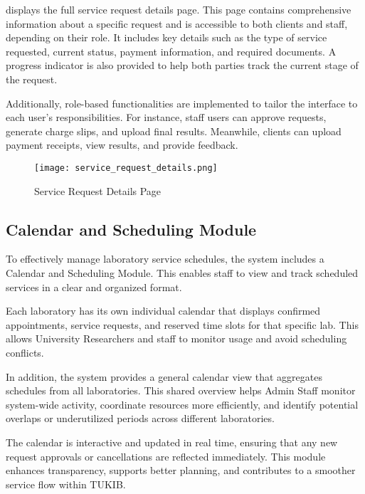  displays the full service request details page. This page contains comprehensive information about a specific request and is accessible to both clients and staff, depending on their role. It includes key details such as the type of service requested, current status, payment information, and required documents. A progress indicator is also provided to help both parties track the current stage of the request.

Additionally, role-based functionalities are implemented to tailor the interface to each user's responsibilities. For instance, staff users can approve requests, generate charge slips, and upload final results. Meanwhile, clients can upload payment receipts, view results, and provide feedback.

\newpage

\begin{figure}[h]
	\centering 
	\texttt{[image: service\_request\_details.png]}
	\caption{Service Request Details Page}
	\label{fig:service_request_details}
\end{figure}

\newpage

\subsection{Calendar and Scheduling Module}

To effectively manage laboratory service schedules, the system includes a Calendar and Scheduling Module. This enables staff to view and track scheduled services in a clear and organized format.

Each laboratory has its own individual calendar that displays confirmed appointments, service requests, and reserved time slots for that specific lab. This allows University Researchers and staff to monitor usage and avoid scheduling conflicts.

In addition, the system provides a general calendar view that aggregates schedules from all laboratories. This shared overview helps Admin Staff monitor system-wide activity, coordinate resources more efficiently, and identify potential overlaps or underutilized periods across different laboratories.

The calendar is interactive and updated in real time, ensuring that any new request approvals or cancellations are reflected immediately. This module enhances transparency, supports better planning, and contributes to a smoother service flow within TUKIB.

